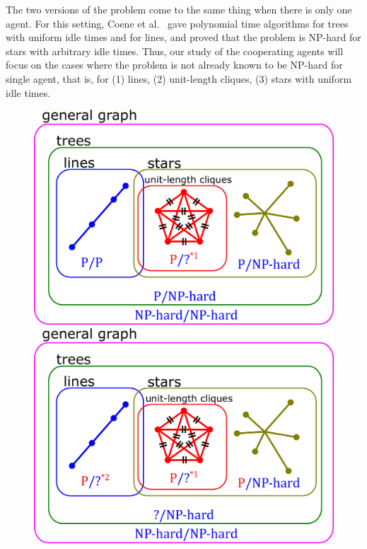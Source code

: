 
The two versions of the problem come to the same thing when there is only one agent.
For this setting, Coene et al.~\cite{coene2011charlemagne} gave 
polynomial time algorithms for trees with uniform idle times and for lines, 
and proved that the problem is NP-hard for stars with arbitrary idle times.
Thus, our study of the cooperating agents will focus on the cases where the problem is not already known to be NP-hard for single agent, that is, for (1) lines, (2) unit-length cliques, (3) stars with uniform idle times.
\begin{figure}[htbp]
  \begin{minipage}{0.48\hsize}%
    \centering
    \includegraphics[width=\hsize]{../fig1_adjust.pdf}
  \end{minipage}%
  \hfill
  \begin{minipage}{0.48\hsize}
    \centering
    \includegraphics[width=\hsize]{../fig2_adjust.pdf}

\end{minipage}
\end{figure}
